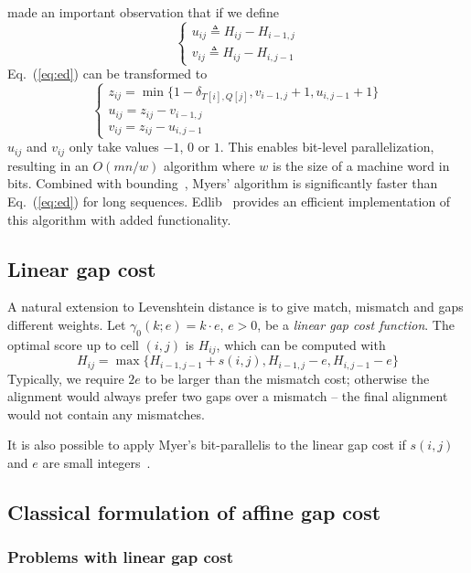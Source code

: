 \documentclass{bioinfo}
\begin{document}
\citet{Myers:1999aa} made an important observation that if we define
\[\left\{\begin{array}{l}
u_{ij}\triangleq H_{ij}-H_{i-1,j}\\
v_{ij}\triangleq H_{ij}-H_{i,j-1}
\end{array}\right.\]
Eq.~(\ref{eq:ed}) can be transformed to
\begin{equation}
\left\{\begin{array}{l}
z_{ij}=\min\{1-\delta_{T[i],Q[j]},v_{i-1,j}+1,u_{i,j-1}+1\}\\
u_{ij}=z_{ij}-v_{i-1,j}\\
v_{ij}=z_{ij}-u_{i,j-1}
\end{array}\right.
\end{equation}
$u_{ij}$ and $v_{ij}$ only take values $-1$, $0$ or $1$. This enables bit-level
parallelization, resulting in an $O(mn/w)$ algorithm where $w$ is the size of a
machine word in bits. Combined with bounding~\citep{Ukkonen:1985aa}, Myers'
algorithm is significantly faster than Eq.~(\ref{eq:ed}) for long sequences.
Edlib~\citep{Sosic:2017aa} provides an efficient implementation of this
algorithm with added functionality.

\subsection{Linear gap cost}

A natural extension to Levenshtein distance is to give match, mismatch and gaps
different weights. Let $\gamma_0(k;e)=k\cdot e$, $e>0$, be a \emph{linear gap
cost function}. The optimal score up to cell $(i,j)$ is $H_{ij}$, which can be
computed with
\begin{equation}\label{eq:linear}
H_{ij}=\max\{H_{i-1,j-1}+s(i,j), H_{i-1,j}-e, H_{i,j-1}-e\}
\end{equation}
Typically, we require $2e$ to be larger than the mismatch cost; otherwise the
alignment would always prefer two gaps over a mismatch -- the final alignment
would not contain any mismatches.

It is also possible to apply Myer's bit-parallelis to the linear gap cost
if $s(i,j)$ and $e$ are small integers~\citep{Loving:2014aa}.

\subsection{Classical formulation of affine gap cost}

\subsubsection{Problems with linear gap cost}
\end{document}
